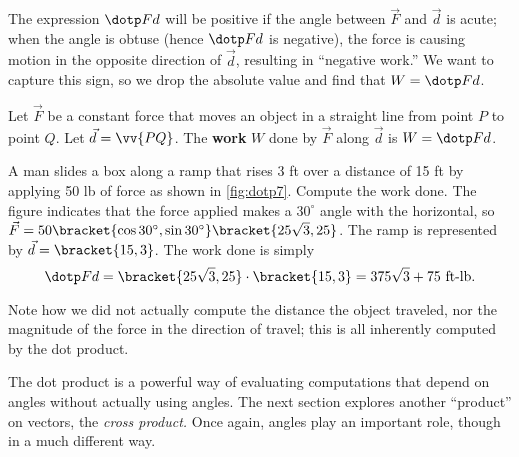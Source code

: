 The expression $\dotp Fd$ will be positive if the angle between $\vec F$ and $\vec d$ is acute; when the angle is obtuse (hence $\dotp Fd$ is negative), the force is causing motion in the opposite direction of $\vec d$, resulting in ``negative work.'' We want to capture this sign, so we drop the absolute value and find that $W = \dotp Fd$.

\begin{definition}[Work]\label{def:work}
Let $\vec F$ be a constant force that moves an object in a straight line from point $P$ to point $Q$. Let $\vec d = \vv{PQ}$. The \textbf{work} $W$ done by $\vec F$ along $\vec d$ is $W = \dotp Fd$.
\end{definition}


\begin{example}\label{ex_dotp7}
A man slides a box along a ramp that rises 3 ft over a distance of 15 ft by applying 50 lb of force as shown in \autoref{fig:dotp7}. Compute the work done.
\solution
The figure indicates that the force applied makes a $30^\circ$ angle with the horizontal, so $\vec F = 50\bracket{\cos 30^\circ,\sin 30^\circ}\bracket{25\sqrt3,25}%
$. The ramp is represented by $\vec d  =\bracket{15,3}$. The work done is simply
\[\dotp Fd = \bracket{25\sqrt3,25}\cdot\bracket{15,3}=375\sqrt3+75%
\text{ ft-lb}.\]

Note how we did not actually compute the distance the object traveled, nor the magnitude of the force in the direction of travel; this is all inherently computed by the dot product.
\end{example}

The dot product is a powerful way of evaluating computations that depend on angles without actually using angles. The next section explores another ``product'' on vectors, the \emph{cross product.} Once again, angles play an important role, though in a much different way.

